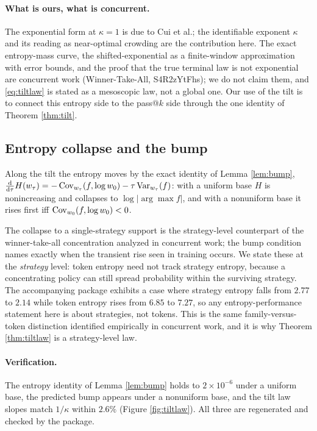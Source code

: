 \paragraph{What is ours, what is concurrent.}
The exponential form at $\kappa=1$ is due to Cui et al.; the identifiable
exponent $\kappa$ and its reading as near-optimal crowding are the contribution
here. The exact entropy-mass curve, the shifted-exponential as a finite-window
approximation with error bounds, and the proof that the true terminal law is not
exponential are concurrent work (Winner-Take-All, S4R2zYtFhs); we do not claim
them, and \eqref{eq:tiltlaw} is stated as a mesoscopic law, not a global one. Our
use of the tilt is to connect this entropy side to the pass@$k$ side through the
one identity of Theorem \ref{thm:tilt}.

\subsection{Entropy collapse and the bump}
\label{sec:entropy}

Along the tilt the entropy moves by the exact identity of Lemma \ref{lem:bump},
$\tfrac{\mathrm d}{\mathrm d\tau}H(w_\tau)=-\operatorname{Cov}_{w_\tau}(f,\log w_0)-\tau\operatorname{Var}_{w_\tau}(f)$:
with a uniform base $H$ is nonincreasing and collapses to $\log|\arg\max f|$, and
with a nonuniform base it rises first iff $\operatorname{Cov}_{w_0}(f,\log w_0)<0$.

The collapse to a single-strategy support is the strategy-level counterpart of
the winner-take-all concentration analyzed in concurrent work; the bump
condition names exactly when the transient rise seen in training occurs. We
state these at the \emph{strategy} level: token entropy need not track strategy
entropy, because a concentrating policy can still spread probability within the
surviving strategy. The accompanying package exhibits a case where strategy
entropy falls from $2.77$ to $2.14$ while token entropy rises from $6.85$ to
$7.27$, so any entropy-performance statement here is about strategies, not
tokens. This is the same family-versus-token distinction identified empirically
in concurrent work, and it is why Theorem \ref{thm:tiltlaw} is a strategy-level
law.

\paragraph{Verification.}
The entropy identity of Lemma \ref{lem:bump} holds to $2\times10^{-6}$ under a
uniform base, the predicted bump appears under a nonuniform base, and the tilt
law slopes match $1/\kappa$ within $2.6\%$ (Figure \ref{fig:tiltlaw}). All three
are regenerated and checked by the package.